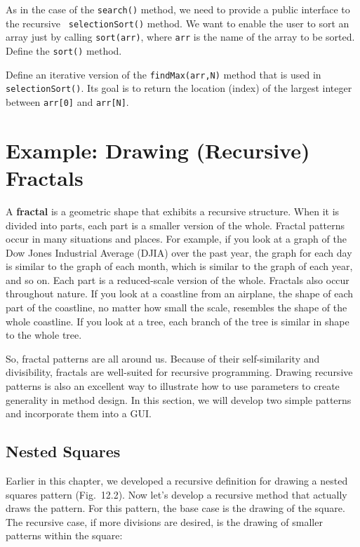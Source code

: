 \begin{SSTUDY}

\item As in the case of the {\tt search()}
method, we need to provide a public interface to the recursive {\tt
selectionSort()} method. We want to enable the user to sort an array
just by calling {\tt sort(arr)}, where {\tt arr} is the name of the
array to be sorted.  Define the {\tt sort()} method.


\item  Define an iterative version of the {\tt findMax(arr,N)} method that is used in
{\tt selectionSort()}. Its goal is to return the location (index) of
the largest integer between {\tt arr[0]} and {\tt arr[N]}.

\end{SSTUDY}

\section{Example: Drawing (Recursive) Fractals}
\label{sec-fractals}\label{pg-sec-fractals}
\noindent A {\bf fractal} is a geometric shape that exhibits a
recursive structure.  When it is divided into parts, each part is a
smaller version of the whole.  Fractal patterns occur in many
situations and places. For example, if you look at a graph of the Dow
Jones Industrial Average (DJIA) over the past year, the graph for each
day is similar to the graph of each month, which is similar to the
graph of each year, and so on.  Each part is a reduced-scale version
of the whole.  Fractals also occur throughout nature. If you look at a
coastline from an airplane, the shape of each part of the coastline,
no matter how small the scale, resembles the shape of the whole
coastline.  If you look at a tree, each branch of the tree is similar
in shape to the whole tree.

So, fractal patterns are all around us.  Because of their
self-similarity and divisibility, fractals are well-suited for
recursive programming.  Drawing recursive patterns is also an
excellent way to illustrate how to use parameters to create generality
in method design.  In this section, we will develop two simple
patterns and incorporate them into a GUI.

\subsection{Nested Squares}
\noindent Earlier in this chapter, we developed a recursive definition
for drawing a nested squares pattern (Fig.~12.2).
Now let's develop a recursive method that actually draws the pattern.
For this pattern, the base case is the drawing of the square.  The
recursive case, if more divisions are desired, is the drawing of
smaller patterns within the square:


